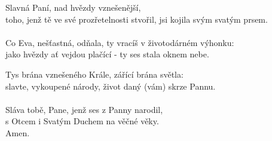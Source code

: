 \begin{translatioMulticol}{2}
Slavná Paní, nad hvězdy vznešenější,\\
toho, jenž tě ve své prozřetelnosti stvořil, jsi kojila svým svatým prsem.\\
\\
Co Eva, nešťastná, odňala, ty vracíš v životodárném výhonku:\\
jako hvězdy ať vejdou plačící - ty ses stala oknem nebe.\columnbreak

Tys brána vznešeného Krále, zářící brána světla:\\
slavte, vykoupené národy, život daný (vám) skrze Pannu.\\
\\
Sláva tobě, Pane, jenž ses z Panny narodil,\\
s Otcem i Svatým Duchem na věčné věky.\\
Amen.
\end{translatioMulticol}
